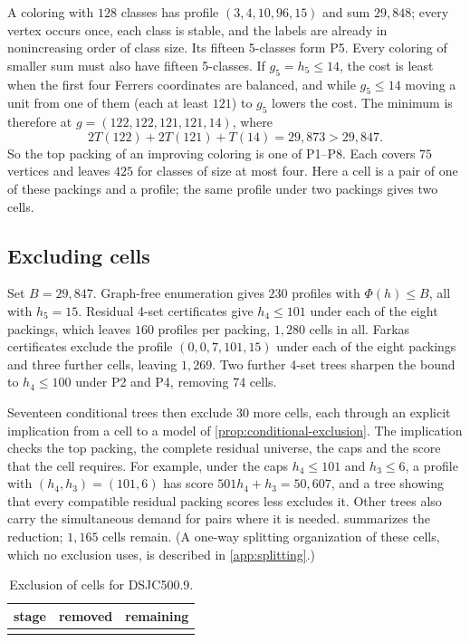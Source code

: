 \documentclass[11pt]{article}
\theoremstyle{definition}
\newcommand{\DSJCFiveHundred}{\textnormal{\textsc{DSJC500.9}}}
\begin{document}
A coloring with $128$ classes has profile $(3,4,10,96,15)$ and sum
$29{,}848$; every vertex occurs once, each class is stable, and the labels are
already in nonincreasing order of class size. Its fifteen 5-classes form P5.
Every coloring of smaller sum must also have fifteen 5-classes. If
$g_5=h_5\le14$, the cost is least when the first four Ferrers coordinates are
balanced, and while $g_5\le14$ moving a unit from one of them (each at least
$121$) to $g_5$ lowers the cost. The minimum is therefore at
$g=(122,122,121,121,14)$, where
\[
  2T(122)+2T(121)+T(14)=29{,}873>29{,}847.
\]
So the top packing of an improving coloring is one of P1--P8. Each covers
$75$ vertices and leaves $425$ for classes of size at most four. Here a cell
is a pair of one of these packings and a profile; the same profile under two
packings gives two cells.

\subsection{Excluding cells}
\label{sec:dsjc500-exclusions}

Set $B=29{,}847$. Graph-free enumeration gives $230$ profiles with
$\Phi(h)\le B$, all with $h_5=15$. Residual 4-set certificates give
$h_4\le101$ under each of the eight packings, which leaves $160$ profiles per
packing, $1{,}280$ cells in all. Farkas certificates exclude the profile
$(0,0,7,101,15)$ under each of the eight packings and three further cells,
leaving $1{,}269$. Two further 4-set trees sharpen the bound to $h_4\le100$
under P2 and P4, removing $74$ cells.

Seventeen conditional trees then exclude $30$ more cells, each through an
explicit implication from a cell to a model of
\cref{prop:conditional-exclusion}. The implication checks the top packing,
the complete residual universe, the caps and the score that the cell
requires. For example, under the caps $h_4\le101$ and $h_3\le6$, a profile
with $(h_4,h_3)=(101,6)$ has score $501h_4+h_3=50{,}607$, and a tree showing
that every compatible residual packing scores less excludes it. Other trees
also carry the simultaneous demand for pairs where it is needed.
 summarizes the reduction; $1{,}165$ cells remain.
(A one-way splitting organization of these cells, which no exclusion uses, is
described in \cref{app:splitting}.)

\begin{table}[t]
\centering
\caption{Exclusion of cells for \DSJCFiveHundred{}.}
\label{tab:dsjc500-reduction}
\begin{tabular}{@{}lrr@{}}
\toprule
stage & removed & remaining\\
\midrule
\tabularnewline
\bottomrule
\end{tabular}
\end{table}
\end{document}

